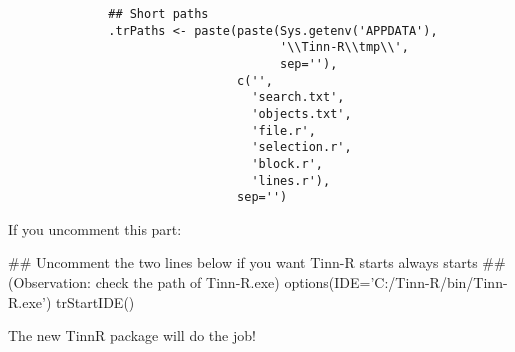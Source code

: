 \begin{itemize}
\begin{itemize}
{{\begin{verbatim}
              ## Short paths                                                                   
              .trPaths <- paste(paste(Sys.getenv('APPDATA'),                                   
                                      '\\Tinn-R\\tmp\\',
                                      sep=''),
                                c('',
                                  'search.txt',
                                  'objects.txt',
                                  'file.r',
                                  'selection.r',
                                  'block.r',
                                  'lines.r'),
                                sep='')
            \end{verbatim}
          } %
        } %

        If you uncomment this part:

        \begin{Scode}
          ## Uncomment the two lines below if you want Tinn-R starts always \RR{} starts
          ## (Observation: check the path of Tinn-R.exe)
          options(IDE='C:/Tinn-R/bin/Tinn-R.exe')
          trStartIDE()
        \end{Scode}

        The new TinnR package will do the job!
    \end{itemize}
\end{itemize}


